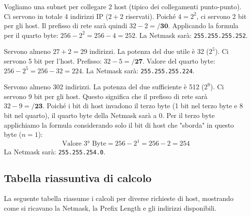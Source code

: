 \begin{example}
Vogliamo una subnet per collegare 2 host (tipico dei collegamenti punto-punto). Ci servono in totale 4 indirizzi IP ($2 + 2$ riservati). 
Poiché $4 = 2^2$, ci servono 2 bit per gli host. Il prefisso di rete sarà quindi $32 - 2 = \textbf{/30}$.
Applicando la formula per il quarto byte: $256 - 2^2 = 256 - 4 = 252$.
La Netmask sarà: \texttt{255.255.255.252}.
\end{example}

\begin{example}
Servono almeno $27 + 2 = 29$ indirizzi. La potenza del due utile è 32 ($2^5$). 
Ci servono 5 bit per l'host. Prefisso: $32 - 5 = \textbf{/27}$.
Valore del quarto byte: $256 - 2^5 = 256 - 32 = 224$.
La Netmask sarà: \texttt{255.255.255.224}.
\end{example}

\begin{example}
Servono almeno 302 indirizzi. La potenza del due sufficiente è 512 ($2^9$).
Ci servono 9 bit per gli host. Questo significa che il prefisso di rete sarà $32 - 9 = \textbf{/23}$.
Poiché i bit di host invadono il terzo byte (1 bit nel terzo byte e 8 bit nel quarto), il quarto byte della Netmask sarà a 0.
Per il terzo byte applichiamo la formula considerando solo il bit di host che "sborda" in questo byte ($n=1$):
\[ \text{Valore 3° Byte} = 256 - 2^1 = 256 - 2 = 254 \]
La Netmask sarà: \texttt{255.255.254.0}.
\end{example}

\subsection{Tabella riassuntiva di calcolo}

La seguente tabella riassume i calcoli per diverse richieste di host, mostrando come si ricavano la Netmask, la Prefix Length e gli indirizzi disponibili.

